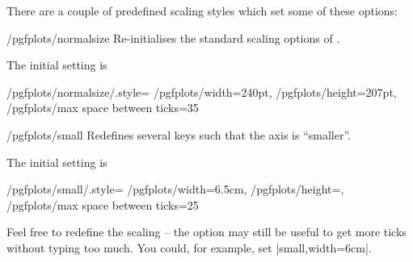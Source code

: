 There are a couple of predefined scaling styles which set some of these options:

\begin{stylekey}{/pgfplots/normalsize}
	Re-initialises the standard scaling options of \PGFPlots.

\begin{codeexample}[]
\end{codeexample}

	The initial setting is
\begin{codeexample}
/pgfplots/normalsize/.style={
	/pgfplots/width=240pt,
	/pgfplots/height=207pt,
	/pgfplots/max space between ticks=35
}
\end{codeexample}
\end{stylekey}

\begin{stylekey}{/pgfplots/small}
	Redefines several keys such that the axis is ``smaller''.

\begin{codeexample}[]
\end{codeexample}
	The initial setting is
\begin{codeexample}
/pgfplots/small/.style={
	/pgfplots/width=6.5cm,
	/pgfplots/height=,
	/pgfplots/max space between ticks=25
}
\end{codeexample}
Feel free to redefine the scaling -- the option may still be useful to get more ticks without typing too much. You could, for example, set |small,width=6cm|.
\end{stylekey}

